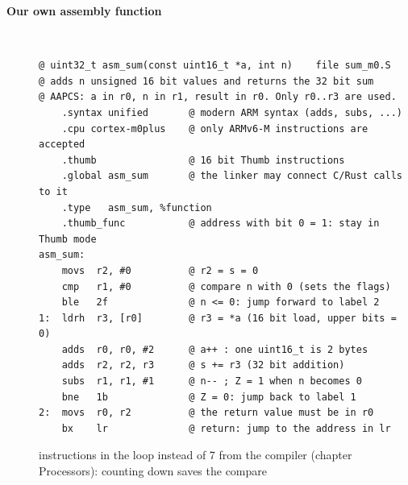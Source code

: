 \begin{description}
\item[{\rot\bf Our own assembly function}]~\\[-\lstskip]
\begin{lstlisting}[language={}]
@ uint32_t asm_sum(const uint16_t *a, int n)    file sum_m0.S
@ adds n unsigned 16 bit values and returns the 32 bit sum
@ AAPCS: a in r0, n in r1, result in r0. Only r0..r3 are used.
    .syntax unified       @ modern ARM syntax (adds, subs, ...)
    .cpu cortex-m0plus    @ only ARMv6-M instructions are accepted
    .thumb                @ 16 bit Thumb instructions
    .global asm_sum       @ the linker may connect C/Rust calls to it
    .type   asm_sum, %function
    .thumb_func           @ address with bit 0 = 1: stay in Thumb mode
asm_sum:
    movs  r2, #0          @ r2 = s = 0
    cmp   r1, #0          @ compare n with 0 (sets the flags)
    ble   2f              @ n <= 0: jump forward to label 2
1:  ldrh  r3, [r0]        @ r3 = *a (16 bit load, upper bits = 0)
    adds  r0, r0, #2      @ a++ : one uint16_t is 2 bytes
    adds  r2, r2, r3      @ s += r3 (32 bit addition)
    subs  r1, r1, #1      @ n-- ; Z = 1 when n becomes 0
    bne   1b              @ Z = 0: jump back to label 1
2:  movs  r0, r2          @ the return value must be in r0
    bx    lr              @ return: jump to the address in lr
\end{lstlisting}
\bi
	 instructions in the loop instead of 7 from the compiler (chapter Processors): counting down saves the compare
\ei
\os{\newpage}



\end{description}
